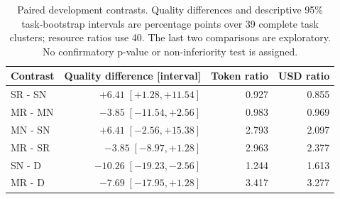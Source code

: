 \begin{table}[htbp]\centering\small
\caption{Paired development contrasts. Quality differences and descriptive 95\% task-bootstrap intervals are percentage points over 39 complete task clusters; resource ratios use 40. The last two comparisons are exploratory. No confirmatory p-value or non-inferiority test is assigned.}\label{tab:dev40-contrasts}
\begin{tabular}{lrrr}\toprule
Contrast & Quality difference [interval] & Token ratio & USD ratio\\
\midrule
SR - SN & $+6.41\;[+1.28,+11.54]$ & 0.927 & 0.855\\
MR - MN & $-3.85\;[-11.54,+2.56]$ & 0.983 & 0.969\\
MN - SN & $+6.41\;[-2.56,+15.38]$ & 2.793 & 2.097\\
MR - SR & $-3.85\;[-8.97,+1.28]$ & 2.963 & 2.377\\
SN - D & $-10.26\;[-19.23,-2.56]$ & 1.244 & 1.613\\
MR - D & $-7.69\;[-17.95,+1.28]$ & 3.417 & 3.277\\
\bottomrule\end{tabular}\end{table}
